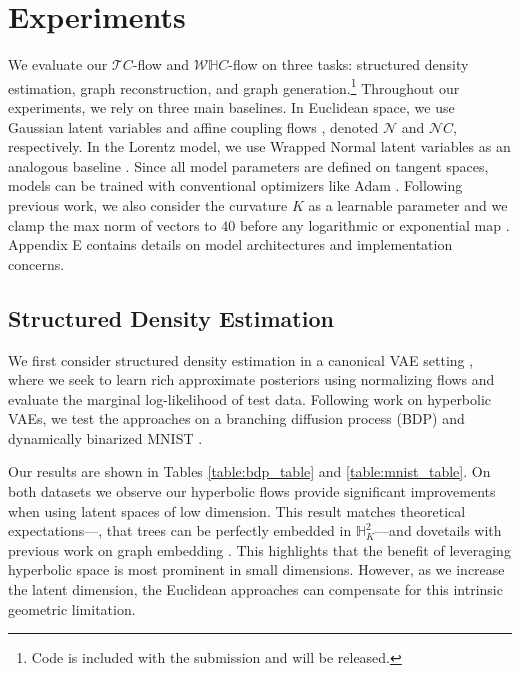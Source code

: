 \section{Experiments}
\label{experiments}
We evaluate our $\mathcal{T}C$-flow and $\mathcal{W}\mathbb{H}C$-flow on three tasks:  structured density estimation, graph reconstruction, and graph generation.\footnote{Code is included with the submission and will be released.} Throughout our experiments, we rely on three main baselines. %
In Euclidean space, we use Gaussian latent variables and affine coupling flows \cite{dinh2016density}, denoted $\mathcal{N}$ and $\mathcal{N}C$, respectively. In the Lorentz model, we use Wrapped Normal latent variables as an analogous baseline \cite{nagano2019wrapped}. Since all model parameters are defined on tangent spaces, models can be trained with conventional optimizers like Adam \cite{kingma2014adam}. Following previous work, we also consider the curvature $K$ as a learnable parameter 
and we clamp the max norm of vectors to $40$ before any logarithmic or exponential map \cite{skopek2019mixed}. Appendix E contains details on model architectures and implementation concerns. 

\subsection{Structured Density Estimation}
We first consider structured density estimation in a canonical VAE setting \cite{kingma2013auto}, where we seek to learn rich approximate posteriors using normalizing flows and evaluate the marginal log-likelihood of test data. Following work on hyperbolic VAEs, we test the approaches on a branching diffusion process (BDP) and dynamically binarized MNIST \cite{mathieu2019continuous,skopek2019mixed}. 

Our results are shown in Tables \ref{table:bdp_table} and \ref{table:mnist_table}.
On both datasets we observe our hyperbolic flows provide significant improvements when using latent spaces of low dimension.
This result matches theoretical expectations---\eg, that trees can be perfectly embedded in $\mathbb{H}^2_K$---and dovetails with previous work on graph embedding \cite{nickel2017poincare}. This highlights that the benefit of leveraging hyperbolic space is most prominent in small dimensions. However, as we increase the latent dimension, the Euclidean approaches can compensate for this intrinsic geometric limitation.  

